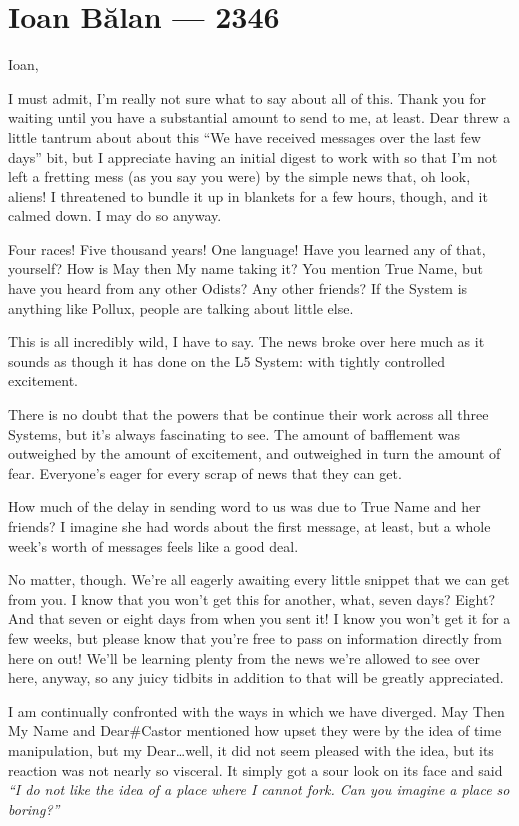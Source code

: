 \hypertarget{ioan-bux103lan-2346}{%
\chapter{Ioan Bălan — 2346}\label{ioan-bux103lan-2346}}

Ioan,

I must admit, I'm really not sure what to say about all of this. Thank you for waiting until you have a substantial amount to send to me, at least. Dear threw a little tantrum about about this ``We have received messages over the last few days'' bit, but I appreciate having an initial digest to work with so that I'm not left a fretting mess (as you say you were) by the simple news that, oh look, aliens! I threatened to bundle it up in blankets for a few hours, though, and it calmed down. I may do so anyway.

Four races! Five thousand years! One language! Have you learned any of that, yourself? How is May then My name taking it? You mention True Name, but have you heard from any other Odists? Any other friends? If the System is anything like Pollux, people are talking about little else.

This is all incredibly wild, I have to say. The news broke over here much as it sounds as though it has done on the L5 System: with tightly controlled excitement.

There is no doubt that the powers that be continue their work across all three Systems, but it's always fascinating to see. The amount of bafflement was outweighed by the amount of excitement, and outweighed in turn the amount of fear. Everyone's eager for every scrap of news that they can get.

How much of the delay in sending word to us was due to True Name and her friends? I imagine she had words about the first message, at least, but a whole week's worth of messages feels like a good deal.

No matter, though. We're all eagerly awaiting every little snippet that we can get from you. I know that you won't get this for another, what, seven days? Eight? And that seven or eight days from when you sent it! I know you won't get it for a few weeks, but please know that you're free to pass on information directly from here on out! We'll be learning plenty from the news we're allowed to see over here, anyway, so any juicy tidbits in addition to that will be greatly appreciated.

I am continually confronted with the ways in which we have diverged. May Then My Name and Dear\#Castor mentioned how upset they were by the idea of time manipulation, but my Dear\ldots well, it did not seem pleased with the idea, but its reaction was not nearly so visceral. It simply got a sour look on its face and said \emph{``I do not like the idea of a place where I cannot fork. Can you imagine a place so boring?''}

